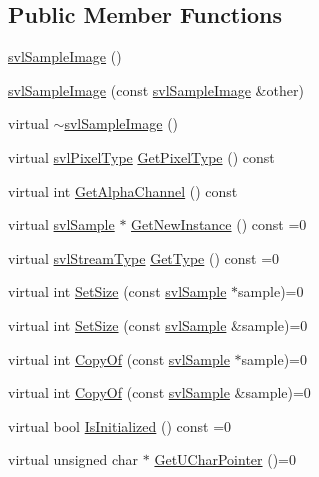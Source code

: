 \subsection*{Public Member Functions}
\begin{DoxyCompactItemize}
\item 
\hyperlink{classsvl_sample_image_a3ea8c6077b2fc3242525420ec735b8cd}{svl\-Sample\-Image} ()
\item 
\hyperlink{classsvl_sample_image_ad1e8932d931df496c76922257f9227d5}{svl\-Sample\-Image} (const \hyperlink{classsvl_sample_image}{svl\-Sample\-Image} \&other)
\item 
virtual \hyperlink{classsvl_sample_image_ab5335f489acd87face50a5bfa4cef0d9}{$\sim$svl\-Sample\-Image} ()
\item 
virtual \hyperlink{svl_definitions_8h_a8e3e868f4df8c6c3a6dba958c81b34b5}{svl\-Pixel\-Type} \hyperlink{classsvl_sample_image_ae43c1829be4c737f25e826ab9aa2dc5c}{Get\-Pixel\-Type} () const 
\item 
virtual int \hyperlink{classsvl_sample_image_ac32fdf4170720d33ffb5ee2bdf75ae5c}{Get\-Alpha\-Channel} () const 
\item 
virtual \hyperlink{classsvl_sample}{svl\-Sample} $\ast$ \hyperlink{classsvl_sample_image_a76fab1c3b1e2ecc2189c0d289d98e66a}{Get\-New\-Instance} () const =0
\item 
virtual \hyperlink{svl_definitions_8h_aa00696d338a58db361335a01fd11e122}{svl\-Stream\-Type} \hyperlink{classsvl_sample_image_a90f04a79c0906179bfecb77d07231a11}{Get\-Type} () const =0
\item 
virtual int \hyperlink{classsvl_sample_image_a47e887ac52468fadc6bc67431644c048}{Set\-Size} (const \hyperlink{classsvl_sample}{svl\-Sample} $\ast$sample)=0
\item 
virtual int \hyperlink{classsvl_sample_image_a29daafd2f51f8ff6ce0ce00080a20fa9}{Set\-Size} (const \hyperlink{classsvl_sample}{svl\-Sample} \&sample)=0
\item 
virtual int \hyperlink{classsvl_sample_image_a22a7170e17637426ff48d3abfdaadc82}{Copy\-Of} (const \hyperlink{classsvl_sample}{svl\-Sample} $\ast$sample)=0
\item 
virtual int \hyperlink{classsvl_sample_image_a4d24e3ee26d7a70f73fb88348a01c1eb}{Copy\-Of} (const \hyperlink{classsvl_sample}{svl\-Sample} \&sample)=0
\item 
virtual bool \hyperlink{classsvl_sample_image_a9a91b9605afdddb16a5b67290039c3a3}{Is\-Initialized} () const =0
\item 
virtual unsigned char $\ast$ \hyperlink{classsvl_sample_image_a40315b943675a7eabe94aced3b7b3e41}{Get\-U\-Char\-Pointer} ()=0

\end{DoxyCompactItemize}
